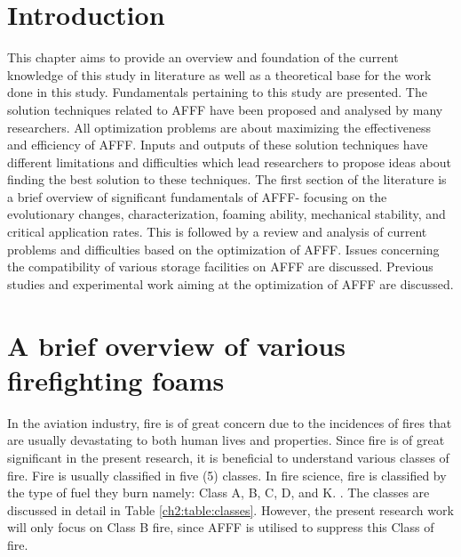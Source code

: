 \documentclass[12pt]{report}
\begin{document}
\section{Introduction}
This chapter aims to provide an overview and foundation of the current knowledge of this study in literature as well as a theoretical base for the work done in this study. Fundamentals pertaining to this study are presented. The solution techniques related to AFFF have been proposed and analysed by many researchers. All optimization problems are about maximizing the effectiveness and efficiency of AFFF. Inputs and outputs of these solution techniques have different limitations and difficulties which lead researchers to propose ideas about finding the best solution to these techniques.
The first section of the literature is a brief overview of significant fundamentals of AFFF- focusing on the evolutionary changes, characterization, foaming ability, mechanical stability, and critical application rates. This is followed by a review and analysis of current problems and difficulties based on the optimization of AFFF. Issues concerning the compatibility of various storage facilities on AFFF are discussed. Previous studies and experimental work aiming at the optimization of AFFF are discussed.

\section{A brief overview of various firefighting foams}
In the aviation industry, fire is of great concern due to the incidences of fires that are usually devastating to both human lives and properties. Since fire is of great significant in the present research, it is beneficial to understand various classes of fire. Fire is usually classified in five (5) classes. In fire science, fire is classified by the type of fuel they burn namely: Class A, B, C, D, and K. \cite{oguike2013study}.  The classes are discussed in detail in Table \ref{ch2:table:classes}. However, the present research work will only focus on Class B fire, since AFFF is utilised to suppress this Class of fire.
\end{document}
